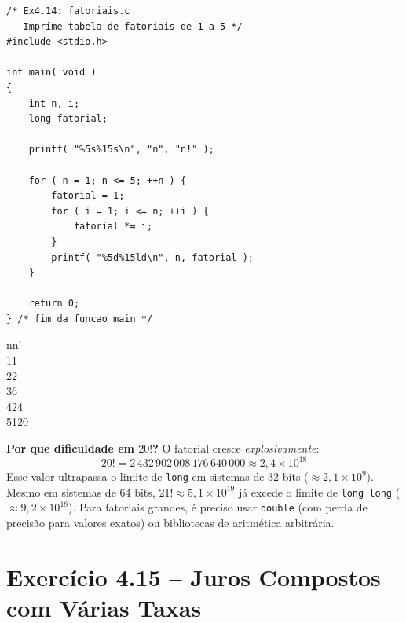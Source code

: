 \documentclass[12pt,a4paper]{article}
\begin{document}
\begin{respostabox}
\begin{lstlisting}
/* Ex4.14: fatoriais.c
   Imprime tabela de fatoriais de 1 a 5 */
#include <stdio.h>

int main( void )
{
    int n, i;
    long fatorial;

    printf( "%5s%15s\n", "n", "n!" );

    for ( n = 1; n <= 5; ++n ) {
        fatorial = 1;
        for ( i = 1; i <= n; ++i ) {
            fatorial *= i;
        }
        printf( "%5d%15ld\n", n, fatorial );
    }

    return 0;
} /* fim da funcao main */
\end{lstlisting}

\begin{saida}
\hphantom{xx}n\hphantom{xxxxxxxxxxxx}n!\\
\hphantom{xx}1\hphantom{xxxxxxxxxxxxx}1\\
\hphantom{xx}2\hphantom{xxxxxxxxxxxxx}2\\
\hphantom{xx}3\hphantom{xxxxxxxxxxxxx}6\\
\hphantom{xx}4\hphantom{xxxxxxxxxxxx}24\\
\hphantom{xx}5\hphantom{xxxxxxxxxxx}120
\end{saida}

\textbf{Por que dificuldade em $20!$?} O fatorial cresce \textit{explosivamente}:
\[
  20! = 2\,432\,902\,008\,176\,640\,000 \approx 2{,}4 \times 10^{18}
\]
Esse valor ultrapassa o limite de \texttt{long} em sistemas de 32 bits ($\approx 2{,}1 \times 10^9$).
Mesmo em sistemas de 64 bits, $21! \approx 5{,}1 \times 10^{19}$ já excede o limite de
\texttt{long long} (\(\approx 9{,}2 \times 10^{18}\)). Para fatoriais grandes, é preciso
usar \texttt{double} (com perda de precisão para valores exatos) ou bibliotecas de
aritmética arbitrária.
\end{respostabox}

\section{Exercício 4.15 -- Juros Compostos com Várias Taxas}
\end{document}
